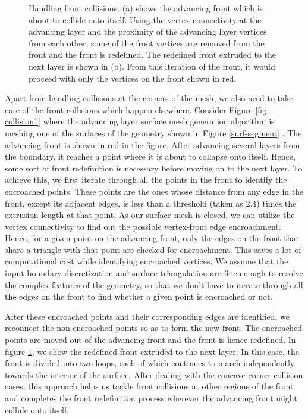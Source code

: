 \documentclass[conf]{new-aiaa}
\begin{document}
\begin{figure}
\begin{subfigure}{.5\textwidth}
  \caption{}
  \label{fig-collision2}
\end{subfigure}
\caption{Handling front collisions. (a) shows the advancing front which is about to collide onto itself. Using the vertex connectivity at the advancing layer and the proximity of the advancing layer vertices from each other, some of the front vertices are removed from the front and the front is redefined. The redefined front extruded to the next layer is shown in (b). From this iteration of the front, it would proceed with only the vertices on the front shown in red.}
\label{fig-collision}
\end{figure}

Apart from handling collisions at the corners of the mesh, we also need to take care of the front collisions which happen elsewhere. Consider Figure \ref{fig-collision1} where the advancing layer surface mesh generation algorithm is meshing one of the surfaces of the geometry shown in Figure \ref{surf-segment} . The advancing front is shown in red in the figure. After advancing several layers from the boundary, it reaches a point where it is about to collapse onto itself. Hence, some sort of front redefinition is necessary before moving on to the next layer. To achieve this, we first iterate through all the points in the front to identify the encroached points. These points are the ones whose distance from any edge in the front, except its adjacent edges, is less than a threshold (taken as $2.4$) times the extrusion length at that point. As our surface mesh is closed, we can utilize the vertex connectivity to find out the possible vertex-front edge encroachment. Hence, for a given point on the advancing front, only the edges on the front that share a triangle with that point are checked for encroachment. This saves a lot of computational cost while identifying encroached vertices. We assume that the input boundary discretization and surface triangulation are fine enough to resolve the complex features of the geometry, so that we don't have to iterate through all the edges on the front to find whether a given point is encroached or not.

After these encroached points and their corresponding edges are identified, we reconnect the non-encroached points so as to form the new front. The encroached points are moved out of the advancing front and the front is hence redefined. In figure \ref{fig-collision2}, we show the redefined front extruded to the next layer. In this case, the front is divided into two loops, each of which continues to march independently towards the interior of the surface. After dealing with the concave corner collision cases, this approach helps us tackle front collisions at other regions of the front  and completes the front redefinition process wherever the advancing front might collide onto itself.
\end{document}
